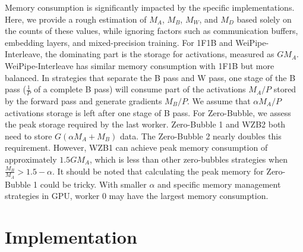 \documentclass[sigplan,review]{acmart}
\begin{document}
Memory consumption is significantly impacted by the specific implementations. Here, we provide a rough estimation of $M_A$, $M_B$, $M_W$, and $M_D$ based solely on the counts of these values, while ignoring factors such as communication buffers, embedding layers, and mixed-precision training. For 1F1B and WeiPipe-Interleave, the dominating part is the storage for activations, measured as $GM_A$. WeiPipe-Interleave has similar memory consumption with 1F1B but more balanced. In strategies that separate the B pass and W pass, one stage of the B pass ($\frac{1}{P}$ of a complete B pass) will consume part of the activations $M_A/P$ stored by the forward pass and generate gradients $M_B/P$. We assume that $\alpha M_A/P$ activations storage is left after one stage of B pass. For Zero-Bubble, we assess the peak storage required by the last worker. Zero-Bubble 1 and WZB2 both need to store $G(\alpha M_A+M_B)$ data. The Zero-Bubble 2 nearly doubles this requirement. However, WZB1 can achieve peak memory consumption of approximately $1.5GM_A$, which is less than other zero-bubbles strategies when $\frac{M_B}{M_A} > 1.5-\alpha $. It should be noted that calculating the peak memory for Zero-Bubble 1 could be tricky. With smaller $\alpha$ and specific memory management strategies in GPU, worker 0 may have the largest memory consumption. 







\section{Implementation} 
\end{document}
